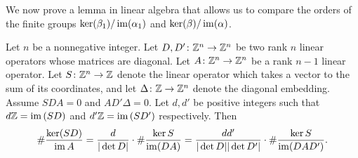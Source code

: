 We now prove a lemma in linear algebra that allows us to compare the orders of the finite groups $\ker(\beta_1)/\operatorname{im}(\alpha_1)$ and $\ker(\beta)/\operatorname{im}(\alpha)$.
\begin{lemma}\label{linear}
Let $n$ be a nonnegative integer. Let $D, D' \colon \mathbb Z^n \rightarrow \mathbb Z^n$ be two rank $n$ linear operators whose matrices are diagonal. Let $A \colon \mathbb Z^n \rightarrow \mathbb Z^n$ be a rank $n-1$ linear operator. Let $S \colon \mathbb Z^n \rightarrow \mathbb Z$ denote the linear operator which takes a vector to the sum of its coordinates, and let $\Delta \colon \mathbb Z \rightarrow \mathbb Z^n$ denote the diagonal embedding. Assume $SDA = 0$ and $AD'\Delta = 0$. Let $d,d'$ be positive integers such that $d\mathbb Z = \operatorname{im} \left( SD \right)$ and $d'\mathbb Z = \operatorname{im} \left( SD' \right)$ respectively. Then
\begin{equation}\label{lalg} \# \frac{\ker (S D) }{\operatorname{im} A} = \frac{d}{|\det D|} \cdot \# \frac{\ker S }{\operatorname{im} (D A)} = \frac{dd'}{|\det D| |\det D'|} \cdot \# \frac{\ker S }{\operatorname{im} ( D A D' )} .\end{equation}
\end{lemma}
